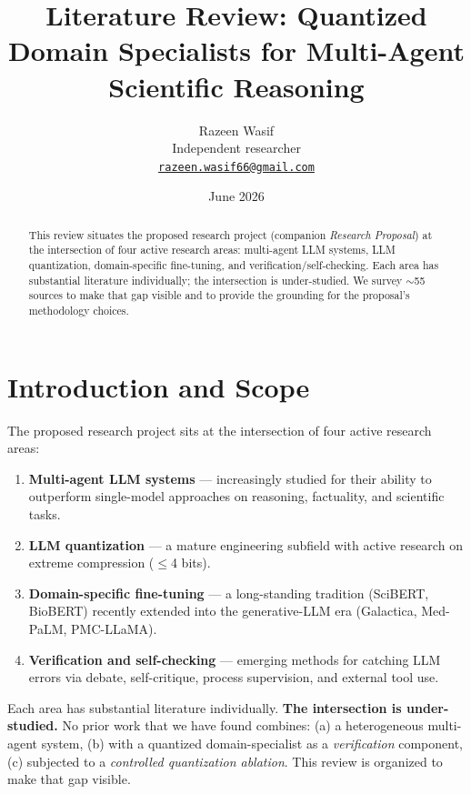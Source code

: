 \documentclass[11pt]{article}
\title{\bfseries Literature Review: Quantized Domain Specialists for Multi-Agent Scientific Reasoning}
\author{Razeen Wasif\\\small Independent researcher\\\small \href{mailto:razeen.wasif66@gmail.com}{\nolinkurl{razeen.wasif66@gmail.com}}}
\date{June 2026}
\begin{document}
\maketitle

\begin{abstract}
\noindent This review situates the proposed research project (companion \emph{Research Proposal}) at the intersection of four active research areas: multi-agent LLM systems, LLM quantization, domain-specific fine-tuning, and verification/self-checking. Each area has substantial literature individually; the intersection is under-studied. We survey $\sim$55 sources to make that gap visible and to provide the grounding for the proposal's methodology choices.
\end{abstract}

\tableofcontents

\section{Introduction and Scope}

The proposed research project sits at the intersection of four active research areas:

\begin{enumerate}
  \item \textbf{Multi-agent LLM systems} --- increasingly studied for their ability to outperform single-model approaches on reasoning, factuality, and scientific tasks.
  \item \textbf{LLM quantization} --- a mature engineering subfield with active research on extreme compression ($\leq$4 bits).
  \item \textbf{Domain-specific fine-tuning} --- a long-standing tradition (SciBERT, BioBERT) recently extended into the generative-LLM era (Galactica, Med-PaLM, PMC-LLaMA).
  \item \textbf{Verification and self-checking} --- emerging methods for catching LLM errors via debate, self-critique, process supervision, and external tool use.
\end{enumerate}

Each area has substantial literature individually. \textbf{The intersection is under-studied.} No prior work that we have found combines: (a) a heterogeneous multi-agent system, (b) with a quantized domain-specialist as a \emph{verification} component, (c) subjected to a \emph{controlled quantization ablation}. This review is organized to make that gap visible.
\end{document}
